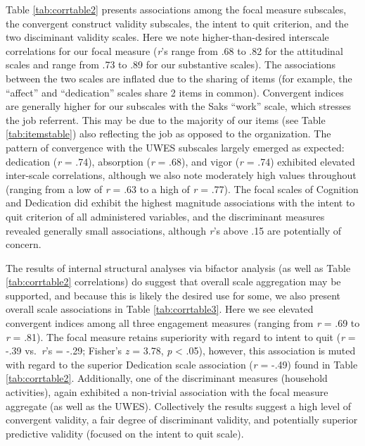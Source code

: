 \documentclass[
  man]{apa7}
\begin{document}
Table \ref{tab:corrtable2} presents associations among the focal measure subscales, the convergent construct validity subscales, the intent to quit criterion, and the two disciminant validity scales. Here we note higher-than-desired interscale correlations for our focal measure (\emph{r}'s range from .68 to .82 for the attitudinal scales and range from .73 to .89 for our substantive scales). The associations between the two scales are inflated due to the sharing of items (for example, the ``affect'' and ``dedication'' scales share 2 items in common). Convergent indices are generally higher for our subscales with the Saks ``work'' scale, which stresses the job referrent. This may be due to the majority of our items (see Table \ref{tab:itemstable}) also reflecting the job as opposed to the organization. The pattern of convergence with the UWES subscales largely emerged as expected: dedication (\emph{r} = .74), absorption (\emph{r} = .68), and vigor (\emph{r} = .74) exhibited elevated inter-scale correlations, although we also note moderately high values throughout (ranging from a low of \emph{r} = .63 to a high of \emph{r} = .77). The focal scales of Cognition and Dedication did exhibit the highest magnitude associations with the intent to quit criterion of all administered variables, and the discriminant measures revealed generally small associations, although \emph{r}'s above .15 are potentially of concern.

The results of internal structural analyses via bifactor analysis (as well as Table \ref{tab:corrtable2} correlations) do suggest that overall scale aggregation may be supported, and because this is likely the desired use for some, we also present overall scale associations in Table \ref{tab:corrtable3}. Here we see elevated convergent indices among all three engagement measures (ranging from \emph{r} = .69 to \emph{r} = .81). The focal measure retains superiority with regard to intent to quit (\emph{r} = -.39 vs.~\emph{r}'s = -.29; Fisher's \emph{z} = 3.78, \emph{p} \textless{} .05), however, this association is muted with regard to the superior Dedication scale association (\emph{r} = -.49) found in Table \ref{tab:corrtable2}. Additionally, one of the discriminant measures (household activities), again exhibited a non-trivial association with the focal measure aggregate (as well as the UWES). Collectively the results suggest a high level of convergent validity, a fair degree of discriminant validity, and potentially superior predictive validity (focused on the intent to quit scale).
\end{document}

